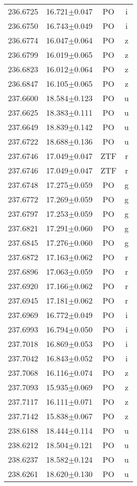 \begin{table}
\begin{tabular}{cccc}
236.6725 & 16.721$\pm$0.047 & PO & i \\
236.6750 & 16.743$\pm$0.049 & PO & i \\
236.6774 & 16.047$\pm$0.064 & PO & z \\
236.6799 & 16.019$\pm$0.065 & PO & z \\
236.6823 & 16.012$\pm$0.064 & PO & z \\
236.6847 & 16.105$\pm$0.065 & PO & z \\
237.6600 & 18.584$\pm$0.123 & PO & u \\
237.6625 & 18.383$\pm$0.111 & PO & u \\
237.6649 & 18.839$\pm$0.142 & PO & u \\
237.6722 & 18.688$\pm$0.136 & PO & u \\
237.6746 & 17.049$\pm$0.047 & ZTF & r \\
237.6746 & 17.049$\pm$0.047 & ZTF & r \\
237.6748 & 17.275$\pm$0.059 & PO & g \\
237.6772 & 17.269$\pm$0.059 & PO & g \\
237.6797 & 17.253$\pm$0.059 & PO & g \\
237.6821 & 17.291$\pm$0.060 & PO & g \\
237.6845 & 17.276$\pm$0.060 & PO & g \\
237.6872 & 17.163$\pm$0.062 & PO & r \\
237.6896 & 17.063$\pm$0.059 & PO & r \\
237.6920 & 17.166$\pm$0.062 & PO & r \\
237.6945 & 17.181$\pm$0.062 & PO & r \\
237.6969 & 16.772$\pm$0.049 & PO & i \\
237.6993 & 16.794$\pm$0.050 & PO & i \\
237.7018 & 16.869$\pm$0.053 & PO & i \\
237.7042 & 16.843$\pm$0.052 & PO & i \\
237.7068 & 16.116$\pm$0.074 & PO & z \\
237.7093 & 15.935$\pm$0.069 & PO & z \\
237.7117 & 16.111$\pm$0.071 & PO & z \\
237.7142 & 15.838$\pm$0.067 & PO & z \\
238.6188 & 18.444$\pm$0.114 & PO & u \\
238.6212 & 18.504$\pm$0.121 & PO & u \\
238.6237 & 18.582$\pm$0.124 & PO & u \\
238.6261 & 18.620$\pm$0.130 & PO & u \\

\end{tabular}
\end{table}
